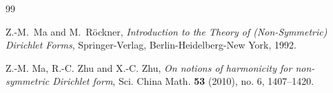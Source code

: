 \documentclass[12pt,a4paper]{article}
\newcommand{\1}{{\bf 1}}
\begin{document}
\begin{thebibliography}{99}
%
%



%





{Z.-M.~Ma and M.~R\"ockner}, 
\emph{Introduction to the Theory of (Non-Symmetric) Dirichlet Forms}, 
Springer-Verlag, Berlin-Heidelberg-New York, 1992.

{Z.-M. Ma, R.-C. Zhu and X.-C. Zhu}, 
\emph{On notions of harmonicity
for non-symmetric Dirichlet form}, 
{Sci. China Math.} \textbf{53} (2010), no. 6, 1407--1420.





\end{thebibliography}
\end{document}
